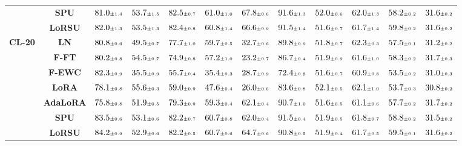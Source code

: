 \begin{table}
\begin{center}
\begin{small}
\begin{tabular}{l c c c c c c c c c c c}
& \textbf{SPU} & $81.0 \mtiny{\pm 1.4}$ & $53.7 \mtiny{\pm 1.5}$ & $82.5 \mtiny{\pm 0.7}$ & $61.0 \mtiny{\pm 1.0}$ & $67.8 \mtiny{\pm 0.6}$ & $91.6 \mtiny{\pm 1.3}$ & $52.0 \mtiny{\pm 0.6}$ & $62.0 \mtiny{\pm 1.3}$ & $58.2 \mtiny{\pm 0.2}$ & $31.6 \mtiny{\pm 0.2}$ \\
& \textbf{LoRSU} & $82.0 \mtiny{\pm 1.3}$ & $53.5 \mtiny{\pm 1.3}$ & $82.4 \mtiny{\pm 0.8}$ & $60.8 \mtiny{\pm 1.4}$ & $66.6 \mtiny{\pm 0.9}$ & $91.5 \mtiny{\pm 1.4}$ & $51.6 \mtiny{\pm 0.7}$ & $61.7 \mtiny{\pm 1.4}$ & $59.8 \mtiny{\pm 0.2}$ & $31.6 \mtiny{\pm 0.2}$ \\
\midrule
\multirow{7}{*}{\textbf{CL-20}} & \textbf{LN} & $80.8 \mtiny{\pm 0.6}$ & $49.5 \mtiny{\pm 0.7}$ & $77.7 \mtiny{\pm 1.0}$ & $59.7 \mtiny{\pm 0.5}$ & $32.7 \mtiny{\pm 0.6}$ & $89.8 \mtiny{\pm 0.9}$ & $51.8 \mtiny{\pm 0.7}$ & $62.3 \mtiny{\pm 0.3}$ & $57.5 \mtiny{\pm 0.1}$ & $31.2 \mtiny{\pm 0.2}$ \\
& \textbf{F-FT} & $80.2 \mtiny{\pm 0.8}$ & $54.5 \mtiny{\pm 0.7}$ & $74.9 \mtiny{\pm 0.8}$ & $57.2 \mtiny{\pm 1.0}$ & $23.2 \mtiny{\pm 0.7}$ & $86.7 \mtiny{\pm 0.4}$ & $51.9 \mtiny{\pm 0.9}$ & $61.6 \mtiny{\pm 1.0}$ & $58.3 \mtiny{\pm 0.2}$ & $31.7 \mtiny{\pm 0.3}$ \\
& \textbf{F-EWC} & $82.3 \mtiny{\pm 0.9}$ & $35.5 \mtiny{\pm 0.9}$ & $55.7 \mtiny{\pm 0.4}$ & $35.4 \mtiny{\pm 0.3}$ & $28.7 \mtiny{\pm 0.9}$ & $72.4 \mtiny{\pm 0.8}$ & $51.6 \mtiny{\pm 0.7}$ & $60.9 \mtiny{\pm 0.8}$ & $53.5 \mtiny{\pm 0.2}$ & $31.0 \mtiny{\pm 0.3}$ \\
& \textbf{LoRA} & $78.1 \mtiny{\pm 0.8}$ & $55.6 \mtiny{\pm 0.3}$ & $59.0 \mtiny{\pm 0.9}$ & $47.6 \mtiny{\pm 0.4}$ & $26.0 \mtiny{\pm 0.6}$ & $83.6 \mtiny{\pm 0.8}$ & $52.1 \mtiny{\pm 0.5}$ & $62.1 \mtiny{\pm 1.0}$ & $53.7 \mtiny{\pm 0.3}$ & $30.8 \mtiny{\pm 0.2}$ \\
& \textbf{AdaLoRA} & $75.8 \mtiny{\pm 0.8}$ & $51.9 \mtiny{\pm 0.5}$ & $79.3 \mtiny{\pm 0.9}$ & $59.3 \mtiny{\pm 0.4}$ & $62.1 \mtiny{\pm 0.4}$ & $90.7 \mtiny{\pm 1.0}$ & $51.6 \mtiny{\pm 0.5}$ & $61.1 \mtiny{\pm 0.6}$ & $57.7 \mtiny{\pm 0.2}$ & $31.7 \mtiny{\pm 0.2}$ \\
& \textbf{SPU} & $83.5 \mtiny{\pm 0.6}$ & $53.1 \mtiny{\pm 0.6}$ & $82.2 \mtiny{\pm 0.7}$ & $60.7 \mtiny{\pm 0.8}$ & $62.0 \mtiny{\pm 0.4}$ & $91.5 \mtiny{\pm 0.4}$ & $51.9 \mtiny{\pm 0.5}$ & $61.8 \mtiny{\pm 0.7}$ & $58.8 \mtiny{\pm 0.2}$ & $31.5 \mtiny{\pm 0.2}$ \\
& \textbf{LoRSU} & $84.2 \mtiny{\pm 0.9}$ & $52.9 \mtiny{\pm 0.6}$ & $82.2 \mtiny{\pm 0.5}$ & $60.7 \mtiny{\pm 0.6}$ & $64.7 \mtiny{\pm 0.6}$ & $90.8 \mtiny{\pm 0.5}$ & $51.9 \mtiny{\pm 0.4}$ & $61.7 \mtiny{\pm 0.5}$ & $59.5 \mtiny{\pm 0.1}$ & $31.6 \mtiny{\pm 0.2}$ \\

\end{tabular}
\end{small}
\end{center}
\end{table}
